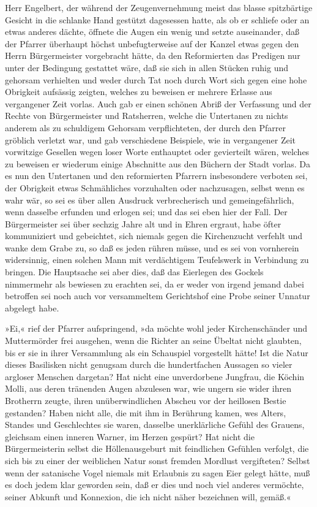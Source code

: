 Herr Engelbert, der während der Zeugenvernehmung meist das blasse
spitzbärtige Gesicht in die schlanke Hand gestützt dagesessen
hatte, als ob er schliefe oder an etwas anderes dächte, öffnete die
Augen ein wenig und setzte auseinander, daß der Pfarrer überhaupt
höchst unbefugterweise auf der Kanzel etwas gegen den Herrn
Bürgermeister vorgebracht hätte, da den Reformierten das Predigen
nur unter der Bedingung gestattet wäre, daß sie sich in allen
Stücken ruhig und gehorsam verhielten und weder durch Tat noch
durch Wort sich gegen eine hohe Obrigkeit aufsässig zeigten,
\pagenum{[33]}welches zu beweisen er mehrere Erlasse aus
vergangener Zeit vorlas. Auch gab er einen schönen Abriß der
Verfassung und der Rechte von Bürgermeister und Ratsherren, welche
die Untertanen zu nichts anderem als zu schuldigem Gehorsam
verpflichteten, der durch den Pfarrer gröblich verletzt war, und
gab verschiedene Beispiele, wie in vergangener Zeit vorwitzige
Gesellen wegen loser Worte enthauptet oder gevierteilt wären,
welches zu beweisen er wiederum einige Abschnitte aus den Büchern
der Stadt vorlas. Da es nun den Untertanen und den reformierten
Pfarrern insbesondere verboten sei, der Obrigkeit etwas
Schmähliches vorzuhalten oder nachzusagen, selbst wenn es wahr wär,
so sei es über allen Ausdruck verbrecherisch und gemeingefährlich,
wenn dasselbe erfunden und erlogen sei; und das sei eben hier der
Fall. Der Bürgermeister sei über sechzig Jahre alt und in Ehren
ergraut, habe öfter kommuniziert und gebeichtet, sich niemals gegen
die Kirchenzucht verfehlt und wanke dem Grabe zu, so daß es jeden
rühren müsse, und es sei von vornherein widersinnig, einen solchen
Mann mit verdächtigem Teufelswerk in Verbindung zu bringen. Die
Hauptsache sei aber dies, daß das Eierlegen des Gockels nimmermehr
als bewiesen zu erachten sei, da er weder von irgend jemand dabei
betroffen sei noch auch vor versammeltem Gerichtshof eine Probe
seiner Unnatur abgelegt habe.

»Ei,« rief der Pfarrer aufspringend, »da möchte wohl jeder
Kirchenschänder und Muttermörder frei ausgehen, wenn die Richter an
seine Übeltat nicht glaubten, bis er sie in ihrer Versammlung als
ein Schauspiel vorgestellt hätte! Ist die Natur dieses Basilisken
nicht genugsam durch die hundertfachen Aussagen so vieler argloser
Menschen dargetan? Hat nicht eine unverdorbene Jungfrau, die Köchin
\pagenum{[34]}Molli, aus deren tränenden Augen abzulesen war, wie
ungern sie wider ihren Brotherrn zeugte, ihren unüberwindlichen
Abscheu vor der heillosen Bestie gestanden? Haben nicht alle, die
mit ihm in Berührung kamen, wes Alters, Standes und Geschlechtes
sie waren, dasselbe unerklärliche Gefühl des Grauens, gleichsam
einen inneren Warner, im Herzen gespürt? Hat nicht die
Bürgermeisterin selbst die Höllenausgeburt mit feindlichen Gefühlen
verfolgt, die sich bis zu einer der weiblichen Natur sonst fremden
Mordlust vergifteten? Selbst wenn der satanische Vogel niemals mit
Erlaubnis zu sagen Eier gelegt hätte, muß es doch jedem klar
geworden sein, daß er dies und noch viel anderes vermöchte, seiner
Abkunft und Konnexion, die ich nicht näher bezeichnen will,
gemäß.«

